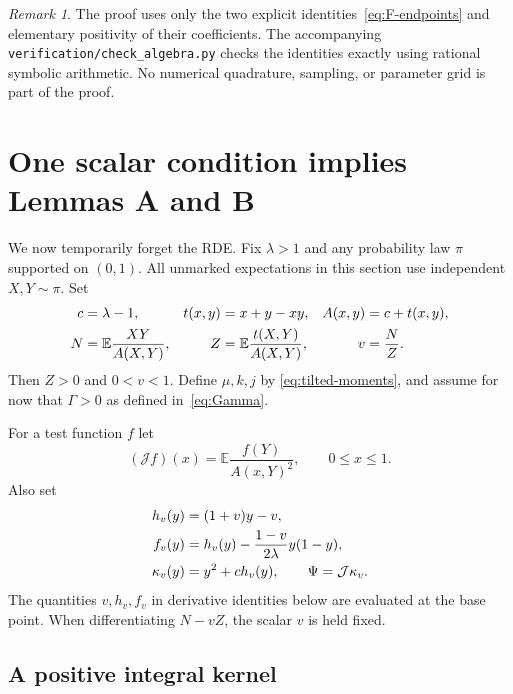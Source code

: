 \documentclass[11pt,a4paper]{article}
\numberwithin{equation}{section}
\theoremstyle{plain}
\theoremstyle{definition}
\theoremstyle{remark}
\newtheorem{remark}[remark]{Remark}
\newcommand{\E}{\mathbb E}
\newcommand{\J}{\mathcal J}
\begin{document}
\begin{remark}\label{rem:exact-algebra}
The proof uses only the two explicit identities~\eqref{eq:F-endpoints}
and elementary positivity of their coefficients.  The accompanying
\texttt{verification/check\_algebra.py} checks the identities exactly
using rational symbolic arithmetic.  No numerical quadrature, sampling,
or parameter grid is part of the proof.
\end{remark}

\section{One scalar condition implies Lemmas A and B}\label{sec:functional}

We now temporarily forget the RDE.  Fix $\lambda>1$ and any probability
law $\pi$ supported on $(0,1)$.  All unmarked expectations in this section
use independent $X,Y\sim\pi$.  Set
\begin{align}\label{eq:general-functional}
 c&=\lambda-1,&
 t(x,y)&=x+y-xy,&
 A(x,y)&=c+t(x,y),\notag\\
 N&=\E\frac{XY}{A(X,Y)},&
 Z&=\E\frac{t(X,Y)}{A(X,Y)},&
 v&=\frac NZ.
\end{align}
Then $Z>0$ and $0<v<1$.  Define $\mu,k,j$ by
\eqref{eq:tilted-moments}, and assume for now that $\Gamma>0$ as defined
in~\eqref{eq:Gamma}.

For a test function $f$ let
\begin{equation}\label{eq:J-operator}
 (\J f)(x)=\E\frac{f(Y)}{A(x,Y)^2},\qquad 0\le x\le1.
\end{equation}
Also set
\begin{align}\label{eq:h-f-kappa}
 h_v(y)&=(1+v)y-v,\notag\\
 f_v(y)&=h_v(y)-\frac{1-v}{2\lambda}y(1-y),\notag\\
 \kappa_v(y)&=y^2+c h_v(y),\qquad
 \Psi=\J\kappa_v.
\end{align}
The quantities $v,h_v,f_v$ in derivative identities below are evaluated
at the base point.  When differentiating $N-vZ$, the scalar $v$ is held
fixed.

\subsection{A positive integral kernel}
\end{document}

